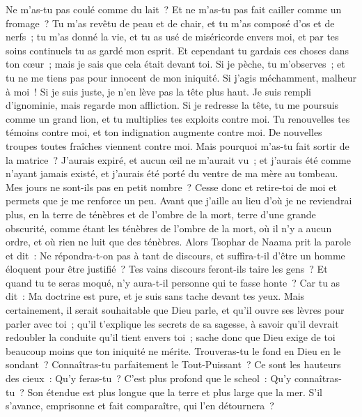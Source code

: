 \begin{multicols}{2}
Ne m'as-tu pas coulé comme du lait~? Et ne m'as-tu pas fait cailler comme un fromage~?
Tu m'as revêtu de peau et de chair, et tu m'as composé d'os et de nerfs~;
tu m'as donné la vie, et tu as usé de miséricorde envers moi, et par tes soins continuels tu as gardé mon esprit.
Et cependant tu gardais ces choses dans ton cœur~; mais je sais que cela était devant toi. 
Si je pèche, tu m'observes~; et tu ne me tiens pas pour innocent de mon iniquité.
Si j'agis méchamment, malheur à moi~! Si je suis juste, je n'en lève pas la tête plus haut. Je suis rempli d'ignominie, mais regarde mon affliction. 
Si je redresse la tête, tu me poursuis comme un grand lion, et tu multiplies tes exploits contre moi.
Tu renouvelles tes témoins contre moi, et ton indignation augmente contre moi. De nouvelles troupes toutes fraîches viennent contre moi.
Mais pourquoi m'as-tu fait sortir de la matrice~? J'aurais expiré, et aucun œil ne m'aurait vu~;
et j'aurais été comme n'ayant jamais existé, et j'aurais été porté du ventre de ma mère au tombeau.
Mes jours ne sont-ils pas en petit nombre~? Cesse donc et retire-toi de moi et permets que je me renforce un peu.
Avant que j'aille au lieu d'où je ne reviendrai plus, en la terre de ténèbres et de l'ombre de la mort,
terre d'une grande obscurité, comme étant les ténèbres de l'ombre de la mort, où il n'y a aucun ordre, et où rien ne luit que des ténèbres. 
\VerseOne{}Alors Tsophar de Naama prit la parole et dit~:
Ne répondra-t-on pas à tant de discours, et suffira-t-il d'être un homme éloquent pour être justifié~?
Tes vains discours feront-ils taire les gens~? Et quand tu te seras moqué, n'y aura-t-il personne qui te fasse honte~?
Car tu as dit~: Ma doctrine est pure, et je suis sans tache devant tes yeux. 
Mais certainement, il serait souhaitable que Dieu parle, et qu'il ouvre ses lèvres pour parler avec toi~;
qu'il t'explique les secrets de sa sagesse, à savoir qu'il devrait redoubler la conduite qu'il tient envers toi~; sache donc que Dieu exige de toi beaucoup moins que ton iniquité ne mérite.
Trouveras-tu le fond en Dieu en le sondant~? Connaîtras-tu parfaitement le Tout-Puissant~? 
Ce sont les hauteurs des cieux~: Qu'y feras-tu~? C'est plus profond que le scheol~: Qu'y connaîtras-tu~?
Son étendue est plus longue que la terre et plus large que la mer.
S'il s'avance, emprisonne et fait comparaître, qui l'en détournera~?

\end{multicols}
